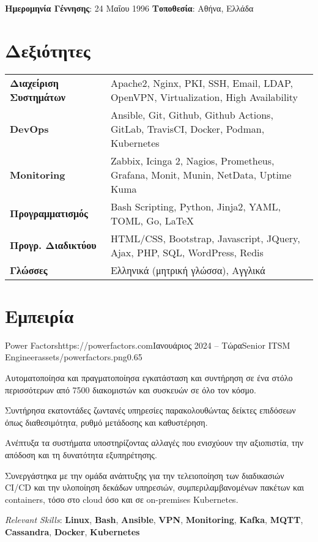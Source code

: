 \documentclass{mycv}
\begin{document}
	\pagestyle{empty}
	\begin{center}
		\textbf{Ημερομηνία Γέννησης}: 24 Μαΐου 1996 {\Large\textperiodcentered} \textbf{Τοποθεσία}: Αθήνα, Ελλάδα
	\end{center}
	
	\section{Δεξιότητες}
	\begin{tabular}{m{4.5cm} m{12.5cm}}
	\textbf{Διαχείριση Συστημάτων} & Apache2, Nginx, PKI, SSH, Email, LDAP, OpenVPN, Virtualization, High Availability \\
	\textbf{DevOps}	               & Ansible, Git, Github, Github Actions, GitLab, TravisCI, Docker, Podman, Kubernetes \\
	\textbf{Monitoring}            & Zabbix, Icinga 2, Nagios, Prometheus, Grafana, Monit, Munin, NetData, Uptime Kuma \\
	\textbf{Προγραμματισμός} 	   & Bash Scripting, Python, Jinja2, YAML, TOML, Go, \LaTeX \\
	\textbf{Προγρ. Διαδικτύου}	   & HTML/CSS, Bootstrap, Javascript, JQuery, Ajax, PHP, SQL, WordPress, Redis \\
	\textbf{Γλώσσες} 			   & Ελληνικά (μητρική γλώσσα), Αγγλικά 
	\end{tabular}

	\section{Εμπειρία}

	\begin{EntryDatedLogo}{Power Factors}{https://powerfactors.com}{Ιανουάριος 2024 -- Τώρα}{Senior ITSM Engineer}{assets/powerfactors.png}{0.65}
		\begin{Itemize}
			\item Αυτοματοποίησα και πραγματοποίησα εγκατάσταση και συντήρηση σε ένα στόλο περισσότερων από 7500 διακομιστών και συσκευών σε όλο τον κόσμο.
			\item Συντήρησα εκατοντάδες ζωντανές υπηρεσίες παρακολουθώντας δείκτες επιδόσεων όπως διαθεσιμότητα, ρυθμό μετάδοσης και καθυστέρηση.
			\item Ανέπτυξα τα συστήματα υποστηρίζοντας αλλαγές που ενισχύουν την αξιοπιστία, την απόδοση και τη δυνατότητα εξυπηρέτησης.
			\item Συνεργάστηκα με την ομάδα ανάπτυξης για την τελειοποίηση των διαδικασιών CI/CD και την υλοποίηση δεκάδων υπηρεσιών, συμπεριλαμβανομένων πακέτων και containers, τόσο στο cloud όσο και σε on-premises Kubernetes.
		\end{Itemize}
		\vspace{-0.3cm}
		\textit{Relevant Skills}: \textbf{Linux}, \textbf{Bash}, \textbf{Ansible}, \textbf{VPN}, \textbf{Monitoring}, \textbf{Kafka}, \textbf{MQTT}, \textbf{Cassandra}, \textbf{Docker}, \textbf{Kubernetes}
	\end{EntryDatedLogo}
	
\end{document}
